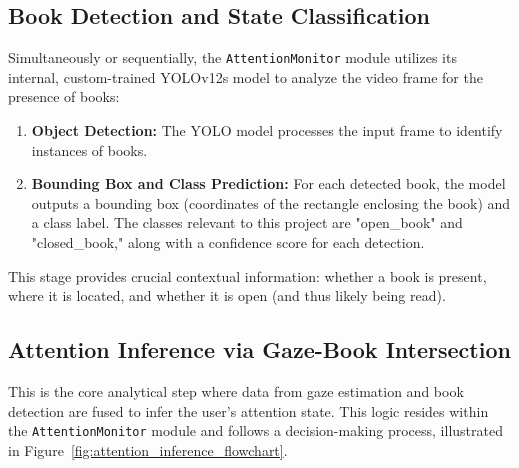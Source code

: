\subsection{Book Detection and State Classification}
Simultaneously or sequentially, the \texttt{AttentionMonitor} module utilizes its internal, custom-trained YOLOv12s model \cite{Redmon_YOLO_2016} to analyze the video frame for the presence of books:
\begin{enumerate}
    \item \textbf{Object Detection:} The YOLO model processes the input frame to identify instances of books.
    \item \textbf{Bounding Box and Class Prediction:} For each detected book, the model outputs a bounding box (coordinates of the rectangle enclosing the book) and a class label. The classes relevant to this project are "open\_book" and "closed\_book," along with a confidence score for each detection.
\end{enumerate}
This stage provides crucial contextual information: whether a book is present, where it is located, and whether it is open (and thus likely being read).

\subsection{Attention Inference via Gaze-Book Intersection}
This is the core analytical step where data from gaze estimation and book detection are fused to infer the user's attention state. This logic resides within the \texttt{AttentionMonitor} module and follows a decision-making process, illustrated in Figure~\ref{fig:attention_inference_flowchart}.

